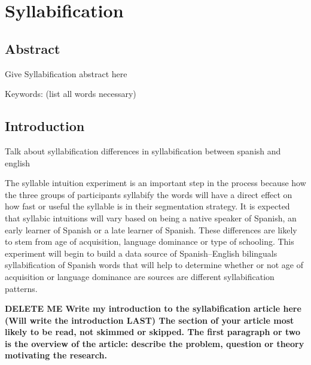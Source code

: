 
\chapter{Syllabification} %

\label{Chapter2} %


\section{Abstract}

Give Syllabification abstract here

Keywords: (list all words necessary)


\section{Introduction}

Talk about syllabification
differences in syllabification between spanish and english

The syllable intuition experiment is an important step in the process because how the three groups of participants syllabify the words will have a direct effect on how fast or useful the syllable is in their segmentation strategy. It is expected that syllabic intuitions will vary based on being a native speaker of Spanish, an early learner of Spanish or a late learner of Spanish. These differences are likely to stem from age of acquisition, language dominance or type of schooling. This experiment will begin to build a data source of Spanish–English bilinguals syllabification of Spanish words that will help to determine whether or not age of acquisition or language dominance are sources are different syllabification patterns. 

\textbf{DELETE ME Write my introduction to the syllabification article here (Will write the introduction LAST)
The section of your article most likely to be read, not skimmed or skipped. The first paragraph or two is the overview of the article: describe the problem, question or theory motivating the research.} 

